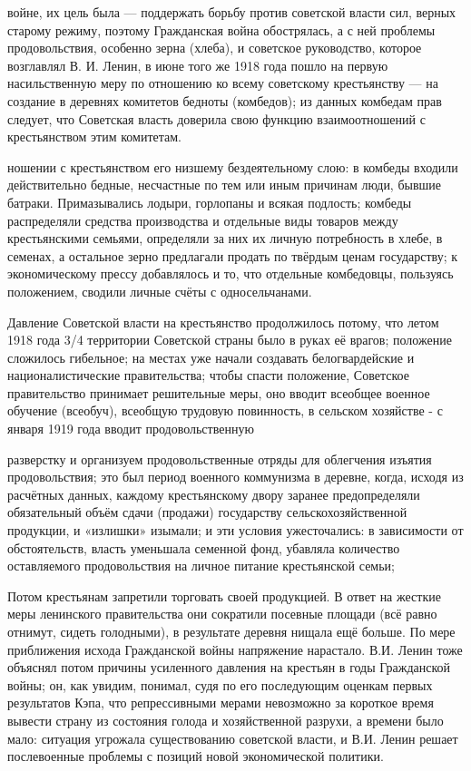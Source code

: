 войне, их цель была — поддержать борьбу против советской власти сил, верных старому режиму, поэтому Гражданская война обострялась, а с ней проблемы продовольствия, особенно зерна (хлеба), и советское руководство, которое возглавлял В. И. Ленин, в июне того же 1918 года пошло на первую насильственную меру по отношению ко всему советскому крестьянству — на создание в деревнях комитетов бедноты (комбедов); из данных комбедам прав следует, что Советская власть доверила свою функцию взаимоотношений с крестьянством этим комитетам.

ношении с крестьянством его низшему бездеятельному слою: в комбеды входили действительно бедные, несчастные по тем или иным причинам люди, бывшие батраки. Примазывались лодыри, горлопаны и всякая подлость; комбеды распределяли средства производства и отдельные виды товаров между крестьянскими семьями, определяли за них их личную потребность в хлебе, в семенах, а остальное зерно предлагали продать по твёрдым ценам государству; к экономическому прессу добавлялось и то, что отдельные комбедовцы, пользуясь положением, сводили личные счёты с односельчанами.

Давление Советской власти на крестьянство продолжилось потому, что летом 1918 года 3/4 территории Советской страны было в руках её врагов; положение сложилось гибельное; на местах уже начали создавать белогвардейские и националистические правительства; чтобы спасти положение, Советское правительство принимает решительные меры, оно вводит всеобщее военное обучение (всеобуч), всеобщую трудовую повинность, в сельском хозяйстве - с января 1919 года вводит продовольственную

разверстку и организуем продовольственные отряды для облегчения изъятия продовольствия; это был период военного коммунизма в деревне, когда, исходя из расчётных данных, каждому крестьянскому двору заранее предопределяли обязательный объём сдачи (продажи) государству сельскохозяйственной продукции, и «излишки» изымали; и эти условия ужесточались: в зависимости от обстоятельств, власть уменьшала семенной фонд, убавляла количество оставляемого продовольствия на личное питание крестьянской семьи;

Потом крестьянам запретили торговать своей продукцией. В ответ на жесткие меры ленинского правительства они сократили посевные площади (всё равно отнимут, сидеть голодными), в результате деревня нищала ещё больше. По мере приближения исхода Гражданской войны напряжение нарастало. В.И. Ленин тоже объяснял потом причины усиленного давления на крестьян в годы Гражданской войны; он, как увидим, понимал, судя по его последующим оценкам первых результатов Кэпа, что репрессивными мерами невозможно за короткое время вывести страну из состояния голода и хозяйственной разрухи, а времени было мало: ситуация угрожала существованию советской власти, и В.И. Ленин решает послевоенные проблемы с позиций новой экономической политики.

